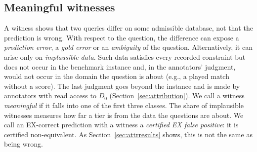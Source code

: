 \subsection{Meaningful witnesses}\label{sec:meaningful}
A witness shows that two queries differ on some admissible database, not that the prediction is wrong. With respect to the question, the difference can expose a \emph{prediction error}, a \emph{gold error} or an \emph{ambiguity} of the question. Alternatively, it can arise only on \emph{implausible data}. Such data satisfies every recorded constraint but does not occur in the benchmark instance and, in the annotators' judgment, would not occur in the domain the question is about (e.g., a played match without a score). The last judgment goes beyond the instance and is made by annotators with read access to $D_0$ (Section~\ref{sec:attribution}). We call a witness \emph{meaningful} if it falls into one of the first three classes. The share of implausible witnesses measures how far a tier is from the data the questions are about. We call an EX-correct prediction with a witness a \emph{certified EX false positive}: it is certified non-equivalent. As Section~\ref{sec:attrresults} shows, this is not the same as being wrong.
